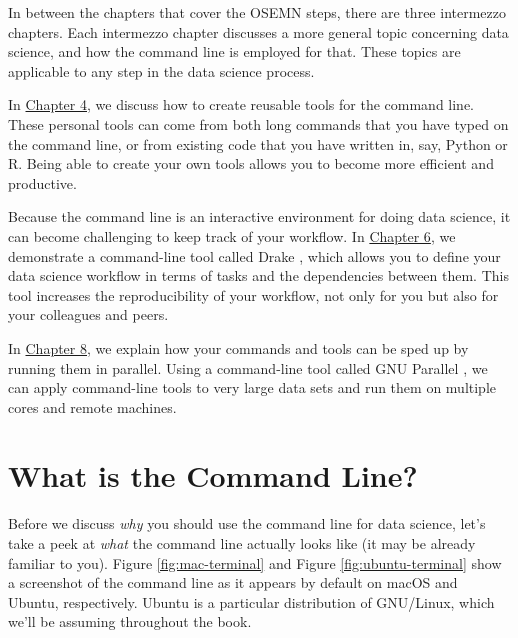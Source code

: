 \documentclass[
]{book}
\theoremstyle{definition}
\theoremstyle{definition}
\theoremstyle{definition}
\theoremstyle{remark}
\begin{document}
In between the chapters that cover the OSEMN steps, there are three intermezzo chapters. Each intermezzo chapter discusses a more general topic concerning data science, and how the command line is employed for that. These topics are applicable to any step in the data science process.

In \protect\hyperlink{chapter-4-creating-reusable-command-line-tools}{Chapter 4}, we discuss how to create reusable tools for the command line. These personal tools can come from both long commands that you have typed on the command line, or from existing code that you have written in, say, Python or R. Being able to create your own tools allows you to become more efficient and productive.

Because the command line is an interactive environment for doing data science, it can become challenging to keep track of your workflow. In \protect\hyperlink{chapter-6-managing-your-data-workflow}{Chapter 6}, we demonstrate a command-line tool called Drake \citep{drake}, which allows you to define your data science workflow in terms of tasks and the dependencies between them. This tool increases the reproducibility of your workflow, not only for you but also for your colleagues and peers.

In \protect\hyperlink{chapter-8-parallel-pipelines}{Chapter 8}, we explain how your commands and tools can be sped up by running them in parallel. Using a command-line tool called GNU Parallel \citep{parallel}, we can apply command-line tools to very large data sets and run them on multiple cores and remote machines.

\hypertarget{what-is-the-command-line}{%
\section{What is the Command Line?}\label{what-is-the-command-line}}

Before we discuss \emph{why} you should use the command line for data science, let's take a peek at \emph{what} the command line actually looks like (it may be already familiar to you). Figure \ref{fig:mac-terminal} and Figure \ref{fig:ubuntu-terminal} show a screenshot of the command line as it appears by default on macOS and Ubuntu, respectively. Ubuntu is a particular distribution of GNU/Linux, which we'll be assuming throughout the book.
\end{document}
